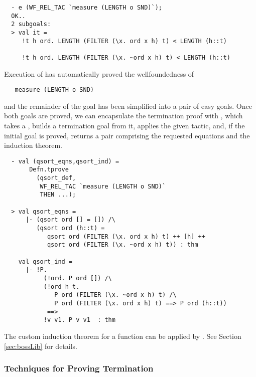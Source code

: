 \begin{session}
\begin{hol}
\begin{verbatim}
  - e (WF_REL_TAC `measure (LENGTH o SND)`);
  OK..
  2 subgoals:
  > val it =
     !t h ord. LENGTH (FILTER (\x. ord x h) t) < LENGTH (h::t)

     !t h ord. LENGTH (FILTER (\x. ~ord x h) t) < LENGTH (h::t)
\end{verbatim}
\end{hol}
\end{session}
%
Execution of  has automatically proved the
wellfoundedness of
%
\begin{hol}
\begin{verbatim}
   measure (LENGTH o SND)
\end{verbatim}
\end{hol}
%
and the remainder of the goal has been simplified into a
pair of easy goals. Once both goals are proved, we can encapsulate
the termination proof with , which takes a ,
builds a termination goal from it, applies the given tactic, and, if the
initial goal is proved, returns a pair comprising the requested
equations and the induction theorem.

\begin{session}
\begin{hol}
\begin{verbatim}
  - val (qsort_eqns,qsort_ind) =
       Defn.tprove
         (qsort_def,
          WF_REL_TAC `measure (LENGTH o SND)`
          THEN ...);

  > val qsort_eqns =
      |- (qsort ord [] = []) /\
         (qsort ord (h::t) =
            qsort ord (FILTER (\x. ord x h) t) ++ [h] ++
            qsort ord (FILTER (\x. ~ord x h) t)) : thm

    val qsort_ind =
      |- !P.
           (!ord. P ord []) /\
           (!ord h t.
              P ord (FILTER (\x. ~ord x h) t) /\
              P ord (FILTER (\x. ord x h) t) ==> P ord (h::t))
            ==>
           !v v1. P v v1  : thm
\end{verbatim}
\end{hol}
\end{session}
The custom induction theorem for a function can be applied by .
See Section \ref{sec:bossLib} for details.

\subsubsection{Techniques for Proving Termination}

